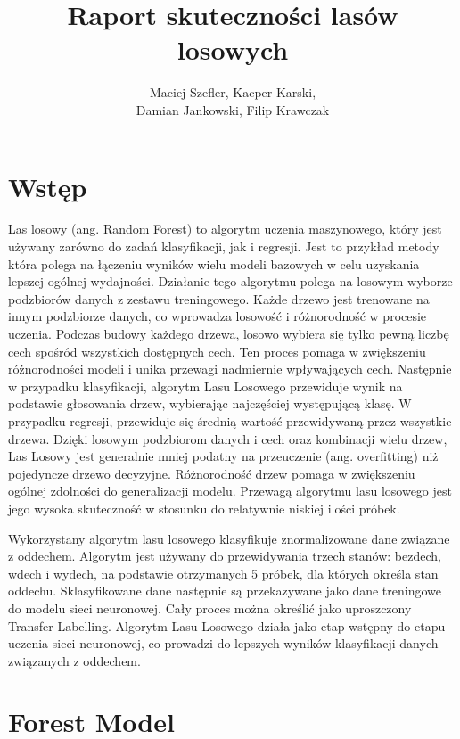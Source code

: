 \documentclass{article}
\title{Raport skuteczności lasów losowych}
\author{Maciej Szefler, Kacper Karski,
    \\Damian Jankowski, Filip Krawczak}
\begin{document}
\maketitle

\tableofcontents

\section{Wstęp}

Las losowy (ang. Random Forest) to algorytm uczenia maszynowego, który jest używany zarówno do zadań klasyfikacji, jak i regresji. Jest to przykład metody która polega na łączeniu wyników wielu modeli bazowych w celu uzyskania lepszej ogólnej wydajności. Działanie tego algorytmu polega na losowym wyborze podzbiorów danych z zestawu treningowego. Każde drzewo jest trenowane na innym podzbiorze danych, co wprowadza losowość i różnorodność w procesie uczenia. Podczas budowy każdego drzewa, losowo wybiera się tylko pewną liczbę cech spośród wszystkich dostępnych cech. Ten proces pomaga w zwiększeniu różnorodności modeli i unika przewagi nadmiernie wpływających cech. Następnie w przypadku klasyfikacji, algorytm Lasu Losowego przewiduje wynik na podstawie głosowania drzew, wybierając najczęściej występującą klasę. W przypadku regresji, przewiduje się średnią wartość przewidywaną przez wszystkie drzewa. Dzięki losowym podzbiorom danych i cech oraz kombinacji wielu drzew, Las Losowy jest generalnie mniej podatny na przeuczenie (ang. overfitting) niż pojedyncze drzewo decyzyjne. Różnorodność drzew pomaga w zwiększeniu ogólnej zdolności do generalizacji modelu.  Przewagą algorytmu lasu losowego jest jego wysoka skuteczność w stosunku do relatywnie niskiej ilości próbek.

Wykorzystany algorytm lasu losowego klasyfikuje znormalizowane dane związane z oddechem. Algorytm jest używany do przewidywania trzech stanów: bezdech, wdech i wydech, na podstawie otrzymanych 5 próbek, dla których określa stan oddechu. Sklasyfikowane dane następnie są przekazywane jako dane treningowe do modelu sieci neuronowej. Cały proces można określić jako uproszczony Transfer Labelling. Algorytm Lasu Losowego działa jako etap wstępny do etapu uczenia sieci neuronowej, co prowadzi do lepszych wyników klasyfikacji danych związanych z oddechem.


\section{Forest Model}
\end{document}

